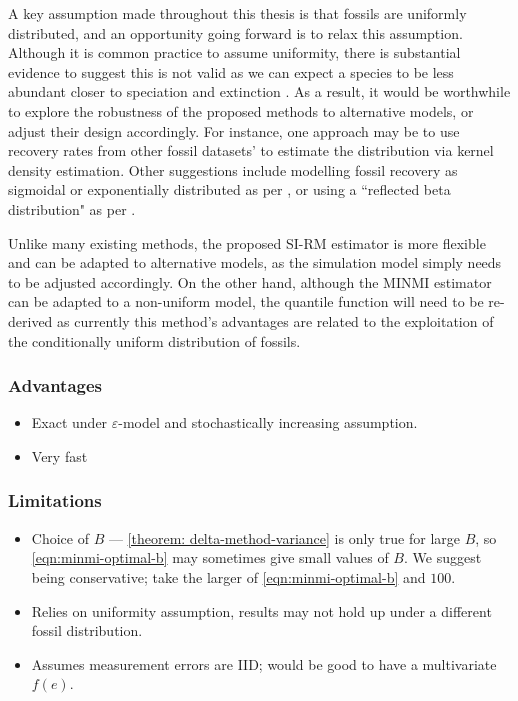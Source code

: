 A key assumption made throughout this thesis is that fossils are uniformly distributed, and an opportunity going forward is to relax this assumption. Although it is common practice to assume uniformity, there is substantial evidence to suggest this is not valid as we can expect a species to be less abundant closer to speciation and extinction \cite{Lee2010, WangMarshall2016}. As a result, it would be worthwhile to explore the robustness of the proposed methods to alternative models, or adjust their design accordingly. For instance, one approach may be to use recovery rates from other fossil datasets' to estimate the distribution via kernel density estimation. Other suggestions include modelling fossil recovery as sigmoidal or exponentially distributed as per \citet{Bradshaw2012}, or using a ``reflected beta distribution" as per \citet{Wang2016}.

Unlike many existing methods, the proposed SI-RM estimator is more flexible and can be adapted to alternative models, as the simulation model simply needs to be adjusted accordingly. On the other hand, although the MINMI estimator can be adapted to a non-uniform model, the quantile function will need to be re-derived as currently this method's advantages are related to the exploitation of the conditionally uniform distribution of fossils.


\subsubsection{Advantages}

\begin{itemize}
    \item Exact under $\varepsilon$-model and stochastically increasing assumption.
    \item Very fast
\end{itemize}

\subsubsection{Limitations}

\begin{itemize}
    \item Choice of $B$ --- \autoref{theorem: delta-method-variance} is only true for large $B$, so \autoref{eqn:minmi-optimal-b} may sometimes give small values of $B$. We suggest being conservative; take the larger of \autoref{eqn:minmi-optimal-b} and $100$.
    \item Relies on uniformity assumption, results may not hold up under a different fossil distribution.
    \item Assumes measurement errors are IID; would be good to have a multivariate $f(e)$.
\end{itemize}

